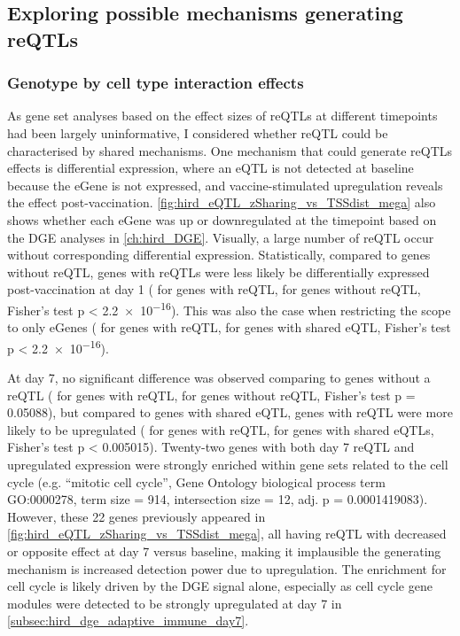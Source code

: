 \subsection{Exploring possible mechanisms generating reQTLs}

\subsubsection{Genotype by cell type interaction effects}

As gene set analyses based on the effect sizes of \glspl{reQTL} at different timepoints had been largely uninformative,
I considered whether \gls{reQTL} could be characterised by shared mechanisms.
One mechanism that could generate \glspl{reQTL} effects is differential expression, where an \gls{eQTL} is not detected at baseline because the eGene is not expressed, and vaccine-stimulated upregulation reveals the effect post-vaccination.
\cref{fig:hird_eQTL_zSharing_vs_TSSdist_mega} also shows whether each eGene was up or downregulated at the timepoint based on the \gls{DGE} analyses in \cref{ch:hird_DGE}.
Visually, a large number of \gls{reQTL} occur without corresponding differential expression.
Statistically, compared to genes without reQTL,
genes with \glspl{reQTL} were less likely be differentially expressed post-vaccination at day 1 ( for genes with reQTL,  for genes without reQTL, Fisher's test p < \num{2.2e-16}).
This was also the case when restricting the scope to only eGenes ( for genes with reQTL,  for genes with shared eQTL, Fisher's test p < \num{2.2e-16}).

At day 7, 
no significant difference was observed comparing to genes without a reQTL ( for genes with reQTL,  for genes without reQTL, Fisher's test p = \num{0.05088}),
but compared to genes with shared \gls{eQTL},
genes with \gls{reQTL} were more likely to be upregulated
( for genes with reQTL,  for genes with shared eQTLs, Fisher's test p < \num{0.005015}).
Twenty-two genes with both day 7 \gls{reQTL} and upregulated expression were strongly enriched within gene sets related to the cell cycle
(e.g. \enquote{mitotic cell cycle}, Gene Ontology biological process term GO:0000278, term size = 914, intersection size = 12, adj. p = \num{0.0001419083}).
However, these 22 genes previously appeared in \cref{fig:hird_eQTL_zSharing_vs_TSSdist_mega},
all having \gls{reQTL} with decreased or opposite effect at day 7 versus baseline,
making it implausible the generating mechanism is increased detection power due to upregulation.
The enrichment for cell cycle is likely driven by the \gls{DGE} signal alone,
especially as cell cycle gene modules were detected to be strongly upregulated at day 7 in \cref{subsec:hird_dge_adaptive_immune_day7}.

